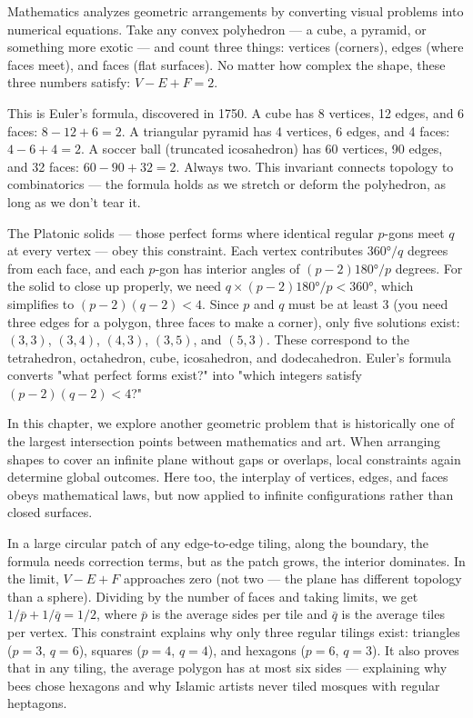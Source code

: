 Mathematics analyzes geometric arrangements by converting visual problems into numerical equations. Take any convex polyhedron — a cube, a pyramid, or something more exotic — and count three things: vertices (corners), edges (where faces meet), and faces (flat surfaces). No matter how complex the shape, these three numbers satisfy: $V - E + F = 2$.

This is Euler's formula, discovered in 1750. A cube has 8 vertices, 12 edges, and 6 faces: $8 - 12 + 6 = 2$. A triangular pyramid has 4 vertices, 6 edges, and 4 faces: $4 - 6 + 4 = 2$. A soccer ball (truncated icosahedron) has 60 vertices, 90 edges, and 32 faces: $60 - 90 + 32 = 2$. Always two. This invariant connects topology to combinatorics — the formula holds as we stretch or deform the polyhedron, as long as we don't tear it.

The Platonic solids — those perfect forms where identical regular $p$-gons meet $q$ at every vertex — obey this constraint. Each vertex contributes $360°/q$ degrees from each face, and each $p$-gon has interior angles of $(p-2)180°/p$ degrees. For the solid to close up properly, we need $q × (p-2)180°/p < 360°$, which simplifies to $(p-2)(q-2) < 4$. Since $p$ and $q$ must be at least 3 (you need three edges for a polygon, three faces to make a corner), only five solutions exist: $(3,3)$, $(3,4)$, $(4,3)$, $(3,5)$, and $(5,3)$. These correspond to the tetrahedron, octahedron, cube, icosahedron, and dodecahedron. Euler's formula converts "what perfect forms exist?" into "which integers satisfy $(p-2)(q-2) < 4$?"

In this chapter, we explore another geometric problem that is historically one of the largest intersection points between mathematics and art. When arranging shapes to cover an infinite plane without gaps or overlaps, local constraints again determine global outcomes. Here too, the interplay of vertices, edges, and faces obeys mathematical laws, but now applied to infinite configurations rather than closed surfaces.

In a large circular patch of any edge-to-edge tiling, along the boundary, the formula needs correction terms, but as the patch grows, the interior dominates. In the limit, $V - E + F$ approaches zero (not two — the plane has different topology than a sphere). Dividing by the number of faces and taking limits, we get $1/\bar{p} + 1/\bar{q} = 1/2$, where $\bar{p}$ is the average sides per tile and $\bar{q}$ is the average tiles per vertex. This constraint explains why only three regular tilings exist: triangles ($p=3$, $q=6$), squares ($p=4$, $q=4$), and hexagons ($p=6$, $q=3$). It also proves that in any tiling, the average polygon has at most six sides — explaining why bees chose hexagons and why Islamic artists never tiled mosques with regular heptagons.


